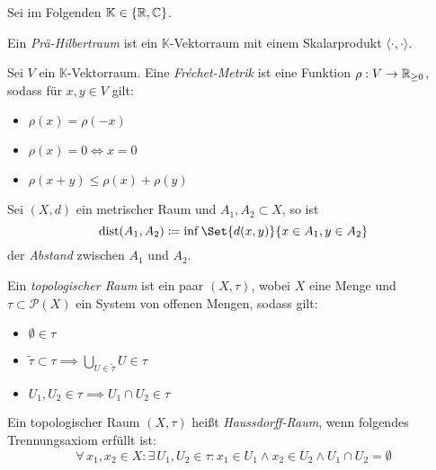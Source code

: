 \documentclass{cheat-sheet}
\newcommand{\K}{\mathbb{K}}
\begin{document}

\begin{nota}
  Sei im Folgenden $\K \in \{ \R, \C \}$.
\end{nota}


\begin{defn}
  Ein \emph{Prä-Hilbertraum} ist ein $\K$-Vektorraum mit einem Skalarprodukt $\langle \cdot , \cdot \rangle$.
\end{defn}

\begin{defn}
  Sei $V$ ein $\K$-Vektorraum. Eine \emph{Fréchet-Metrik} ist eine Funktion $\rho : V \to \mathbb{R}_{\geq 0}$, sodass für $x, y \in V$ gilt:
  \begin{itemize}
    \item $\rho(x) = \rho(-x)$
    \item $\rho(x) = 0 \iff x = 0$
    \item $\rho(x + y) \leq \rho(x) + \rho(y)$
  \end{itemize}
\end{defn}

\begin{defn}
  Sei $(X, d)$ ein metrischer Raum und $A_1, A_2 \subset X$, so ist
  \[ \mathrm{dist}(A_1, A_2) \coloneqq \inf \Set{ d(x,y) }{ x \in A_1, y \in A_2 } \]
  der \emph{Abstand} zwischen $A_1$ und $A_2$.
\end{defn}

\begin{defn}
  Ein \emph{topologischer Raum} ist ein paar $(X, \tau)$, wobei $X$ eine Menge und $\tau \subset \mathcal{P}(X)$ ein System von offenen Mengen, sodass gilt:
  \begin{itemize}
    \item $\emptyset \in \tau$
    \item $\tilde\tau \subset \tau \implies \bigcup_{U \in \tilde\tau} U \in \tau$
    \item $U_1, U_2 \in \tau \implies U_1 \cap U_2 \in \tau$
  \end{itemize}
\end{defn}

\begin{defn}
  Ein topologischer Raum $(X, \tau)$ heißt \emph{Haussdorff-Raum}, wenn folgendes Trennungsaxiom erfüllt ist:
  \[ \forall\, x_1, x_2 \in X : \exists\,U_1, U_2 \in \tau : x_1 \in U_1 \wedge x_2 \in U_2 \wedge U_1 \cap U_2 = \emptyset \]
\end{defn}
\end{document}
